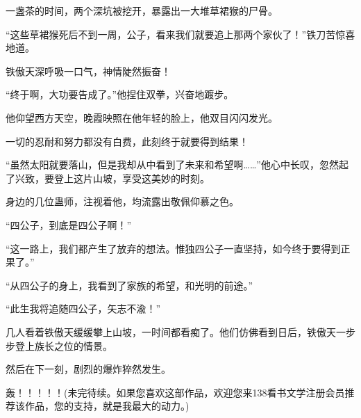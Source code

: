 \begin{this_body}
一盏茶的时间，两个深坑被挖开，暴露出一大堆草裙猴的尸骨。

“这些草裙猴死后不到一周，公子，看来我们就要追上那两个家伙了！”铁刀苦惊喜地道。

铁傲天深呼吸一口气，神情陡然振奋！

“终于啊，大功要告成了。”他捏住双拳，兴奋地踱步。

他仰望西方天空，晚霞映照在他年轻的脸上，他双目闪闪发光。

一切的忍耐和努力都没有白费，此刻终于就要得到结果！

“虽然太阳就要落山，但是我却从中看到了未来和希望啊……”他心中长叹，忽然起了兴致，要登上这片山坡，享受这美妙的时刻。

身边的几位蛊师，注视着他，均流露出敬佩仰慕之色。

“四公子，到底是四公子啊！”

“这一路上，我们都产生了放弃的想法。惟独四公子一直坚持，如今终于要得到正果了。”

“从四公子的身上，我看到了家族的希望，和光明的前途。”

“此生我将追随四公子，矢志不渝！”

几人看着铁傲天缓缓攀上山坡，一时间都看痴了。他们仿佛看到日后，铁傲天一步步登上族长之位的情景。

然后在下一刻，剧烈的爆炸猝然发生。

轰！！！！！(未完待续。如果您喜欢这部作品，欢迎您来138看书文学注册会员推荐该作品，您的支持，就是我最大的动力。)

\end{this_body}

